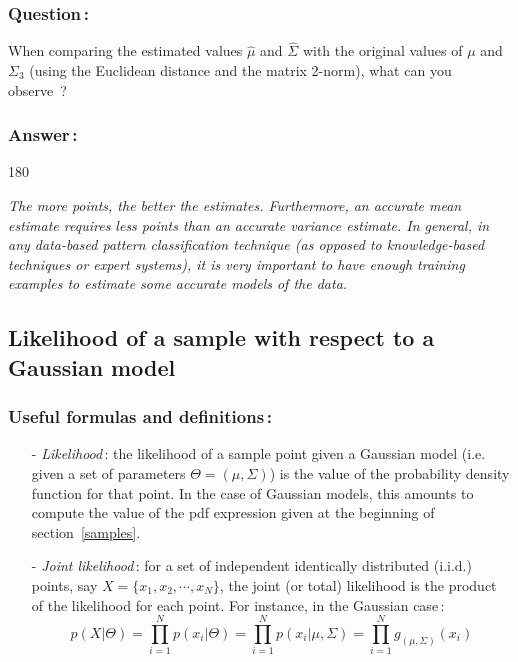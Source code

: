 \documentclass[twoside,a4paper,titlepage]{article}
\newcommand{\expl}[1]{%
\begin{turn}{180}%
\parbox{\textwidth}{\em #1}%
\end{turn}%
}
\begin{document}
\subsubsection*{Question\,:}
When comparing the estimated values $\hat{\mu}$ and $\hat{\Sigma}$ with the
original values of $\mu$ and $\Sigma_3$ (using the Euclidean distance and
the matrix 2-norm), what can you observe~?

\subsubsection*{Answer\,:}
\expl{The more points, the better the estimates. Furthermore, an accurate
mean estimate requires less points than an accurate variance estimate. In
general, in any data-based pattern classification technique (as opposed to
knowledge-based techniques or expert systems), it is very important to have
enough training examples to estimate some accurate models of the data.}

\pagebreak
\subsection{Likelihood of a sample with respect to a Gaussian model}
\label{like}
\subsubsection*{Useful formulas and definitions\,:}
\begin{itemize}
\item[-] {\em Likelihood}\,: the likelihood of a sample point given a
Gaussian model (i.e. given a set of parameters $\Theta = (\mu,\Sigma)$) is
the value of the probability density function for that point. In the case
of Gaussian models, this amounts to compute the value of the pdf expression
given at the beginning of section~\ref{samples}.
\item[-] {\em Joint likelihood}\,: for a set of independent identically
distributed (i.i.d.) points, say $X = \{ x_1, x_2, \cdots, x_N \}$, the
joint (or total) likelihood is the product of the likelihood for each
point. For instance, in the Gaussian case\,:
\[ p(X|\Theta) = 
\prod_{i=1}^{N} p(x_i|\Theta) =
\prod_{i=1}^{N} p(x_i|\mu,\Sigma) =
\prod_{i=1}^{N} g_{(\mu,\Sigma)}(x_i)
\]
\end{itemize}
\end{document}
